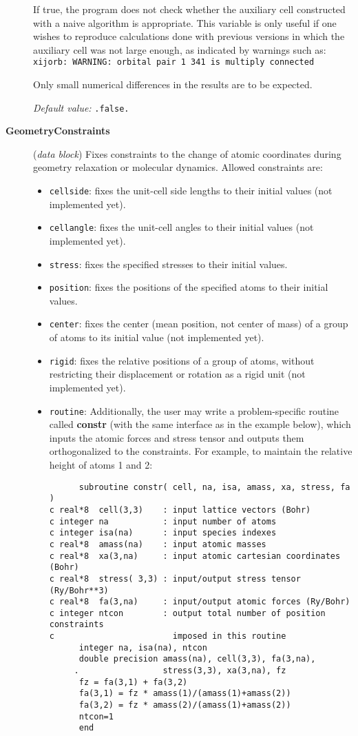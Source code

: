 \documentclass[11pt]{article}
\begin{document}
\begin{description}
If true, the program does not check whether the auxiliary cell
constructed with a naive algorithm is appropriate. This variable
is only useful if one wishes to reproduce calculations done with
previous versions in which the auxiliary cell was not large enough, 
as indicated by warnings such as:\\
\texttt{xijorb: WARNING: orbital pair 1  341 is multiply connected}

Only small numerical differences in the results are to be expected.

{\it Default value:} {\tt .false.}


\item[{\bf GeometryConstraints}] ({\it data block}) 
Fixes constraints to the change of atomic coordinates during
geometry relaxation or molecular dynamics. Allowed constraints are:
\begin{itemize}
\item {\tt cellside}: fixes the unit-cell side lengths to
their initial values (not implemented yet).
\item {\tt cellangle}: fixes the unit-cell angles to
their initial values (not implemented yet).
\item {\tt stress}: fixes the specified stresses to
their initial values.
\item {\tt position}: fixes the positions of the specified atoms to
their initial values.
\item {\tt center}: fixes the center (mean position, not center of
mass) of a group of atoms to its initial value (not implemented yet).
\item {\tt rigid}: fixes the relative positions of a group of atoms,
without restricting their displacement or rotation as a rigid unit
(not implemented yet).
\item {\tt routine}: Additionally, the user may write a 
problem-specific routine called {\bf constr} (with the same 
interface as in the example below), which inputs the atomic
forces and stress tensor and outputs them orthogonalized to the
constraints. For example, to maintain the relative height of 
atoms 1 and 2:

\begin{verbatim}
      subroutine constr( cell, na, isa, amass, xa, stress, fa )
c real*8  cell(3,3)    : input lattice vectors (Bohr)
c integer na           : input number of atoms
c integer isa(na)      : input species indexes
c real*8  amass(na)    : input atomic masses
c real*8  xa(3,na)     : input atomic cartesian coordinates (Bohr)
c real*8  stress( 3,3) : input/output stress tensor (Ry/Bohr**3)
c real*8  fa(3,na)     : input/output atomic forces (Ry/Bohr)
c integer ntcon        : output total number of position constraints
c                        imposed in this routine
      integer na, isa(na), ntcon
      double precision amass(na), cell(3,3), fa(3,na),
     .                 stress(3,3), xa(3,na), fz
      fz = fa(3,1) + fa(3,2) 
      fa(3,1) = fz * amass(1)/(amass(1)+amass(2))
      fa(3,2) = fz * amass(2)/(amass(1)+amass(2))
      ntcon=1
      end
\end{verbatim}


\end{itemize}
\end{description}
\end{document}
